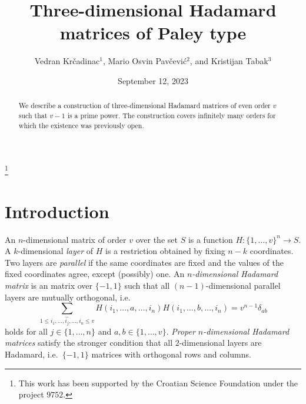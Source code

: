 \documentclass[12pt, reqno]{amsart}
\begin{document}
\title{Three-dimensional Hadamard matrices of Paley type}

\author[V.~Kr\v{c}adinac, M.~O.~Pav\v{c}evi\'{c}, and K.~Tabak]{Vedran Kr\v{c}adinac$^1$, Mario Osvin Pav\v{c}evi\'{c}$^2$, and Kristijan Tabak$^3$}

\address{$^1$Faculty of Science, University of Zagreb, Bijeni\v{c}ka cesta~$30$, HR-$10000$ Zagreb, Croatia}

\address{$^2$Faculty of Electrical Engineering and Computing, University of Zagreb,
Unska~$3$, HR-$10000$ Zagreb, Croatia}

\address{$^3$Rochester Institute of Technology, Zagreb Campus,
D.~T.~Gavrana~$15$, HR-$10000$ Zagreb, Croatia}



\thanks{This work has been supported by the Croatian Science Foundation
under the project $9752$.}



\date{September 12, 2023}

\begin{abstract}
We describe a construction of three-dimensional Hada\-mard matrices of
even order $v$ such that $v-1$ is a prime power. The construction covers
infinitely many orders for which the existence was previously open.
\end{abstract}

\maketitle

\section{Introduction}

An $n$-dimensional matrix of order $v$ over the set $S$ is a function
$H:\{1,\ldots,v\}^n\to S$. A $k$-dimensional \emph{layer} of $H$ is a restriction
obtained by fixing $n-k$ coordinates. Two layers are \emph{parallel} if the same
coordinates are fixed and the values of the fixed coordinates agree, except
(possibly) one. An \emph{$n$-dimensional Hadamard matrix} is an matrix over
$\{-1,1\}$ such that all $(n-1)$-dimensional parallel layers are mutually
orthogonal, i.e.
$$\sum_{1\le i_1,\ldots,\widehat{i_j},\ldots,i_n\le v} H(i_1,\ldots,a,\ldots,i_n)
H(i_1,\ldots,b,\ldots,i_n) = v^{n-1} \delta_{ab}$$
holds for all $j\in \{1,\ldots,n\}$ and $a,b\in \{1,\ldots,v\}$.
\emph{Proper $n$-dimensional Hadamard matrices} satisfy the stronger condition
that all $2$-dimensional layers are Hadamard, i.e.\ $\{-1,1\}$ matrices with
orthogonal rows and columns.
\end{document}
